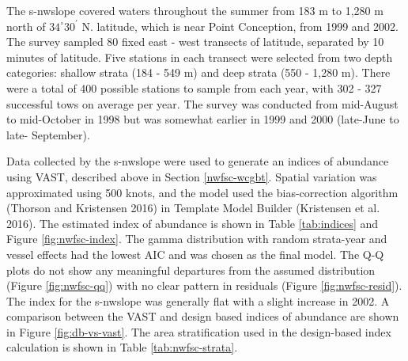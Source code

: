 \documentclass[11pt,
  english,
  a4paper,
]{article}
\begin{document}
\leavevmode\tagmcend\tagstructend


The \gls{s-nwslope} covered waters throughout the summer from 183 m to 1,280 m north of {\(34^\circ 30^\prime\)\leavevmode\tagmcend\tagstructend} N. latitude, which is near Point Conception, from 1999 and 2002. The survey sampled 80 fixed east - west transects of latitude, separated by 10 minutes of latitude. Five stations in each transect were selected from two depth categories: shallow strata (184 - 549 m) and deep strata (550 - 1,280 m). There were a total of 400 possible stations to sample from each year, with 302 - 327 successful tows on average per year. The survey was conducted from mid-August to mid-October in 1998 but was somewhat earlier in 1999 and 2000 (late-June to late- September).

\leavevmode\tagmcend\tagstructend\par


Data collected by the \gls{s-nwslope} were used to generate an indices of abundance using VAST, described above in Section \ref{nwfsc-wcgbt}. Spatial variation was approximated using 500 knots, and the model used the bias-correction algorithm {(Thorson and Kristensen 2016)\leavevmode\tagmcend\tagstructend} in Template Model Builder {(Kristensen et al. 2016)\leavevmode\tagmcend\tagstructend}. The estimated index of abundance is shown in Table \ref{tab:indices} and Figure \ref{fig:nwfsc-index}. The gamma distribution with random strata-year and vessel effects had the lowest AIC and was chosen as the final model. The Q-Q plots do not show any meaningful departures from the assumed distribution (Figure \ref{fig:nwfsc-qq}) with no clear pattern in residuals (Figure \ref{fig:nwfsc-resid}). The index for the \gls{s-nwslope} was generally flat with a slight increase in 2002. A comparison between the VAST and design based indices of abundance are shown in Figure \ref{fig:db-vs-vast}. The area stratification used in the design-based index calculation is shown in Table \ref{tab:nwfsc-strata}.

\leavevmode\tagmcend\tagstructend\par

\end{document}
